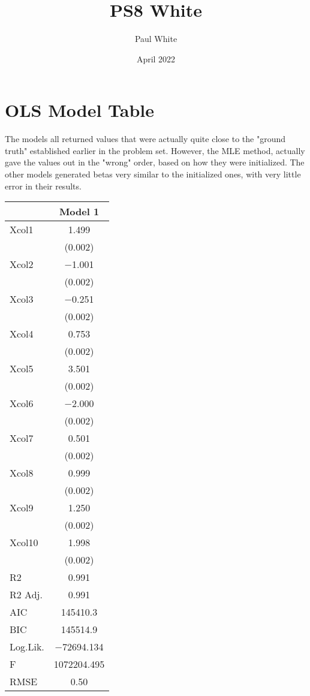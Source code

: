 \documentclass{article}
\title{PS8 White}
\author{Paul White}
\date{April 2022}
\begin{document}
\maketitle

\section{OLS Model Table}

The models all returned values that were actually quite close to the "ground truth" established earlier in the problem set. However, the MLE method, actually gave the values out in the "wrong" order, based on how they were initialized. The other models generated betas very similar to the initialized ones, with very little error in their results. 

\begin{table}
\centering
\begin{tabular}[t]{lc}
\toprule
  & Model 1\\
\midrule
Xcol1 & \num{1.499}\\
 & \vphantom{9} (\num{0.002})\\
Xcol2 & \num{-1.001}\\
 & \vphantom{8} (\num{0.002})\\
Xcol3 & \num{-0.251}\\
 & \vphantom{7} (\num{0.002})\\
Xcol4 & \num{0.753}\\
 & \vphantom{6} (\num{0.002})\\
Xcol5 & \num{3.501}\\
 & \vphantom{5} (\num{0.002})\\
Xcol6 & \num{-2.000}\\
 & \vphantom{4} (\num{0.002})\\
Xcol7 & \num{0.501}\\
 & \vphantom{3} (\num{0.002})\\
Xcol8 & \num{0.999}\\
 & \vphantom{2} (\num{0.002})\\
Xcol9 & \num{1.250}\\
 & \vphantom{1} (\num{0.002})\\
Xcol10 & \num{1.998}\\
 & (\num{0.002})\\
\midrule
R2 & \num{0.991}\\
R2 Adj. & \num{0.991}\\
AIC & \num{145410.3}\\
BIC & \num{145514.9}\\
Log.Lik. & \num{-72694.134}\\
F & \num{1072204.495}\\
RMSE & \num{0.50}\\
\bottomrule
\end{tabular}
\end{table}
\end{document}
